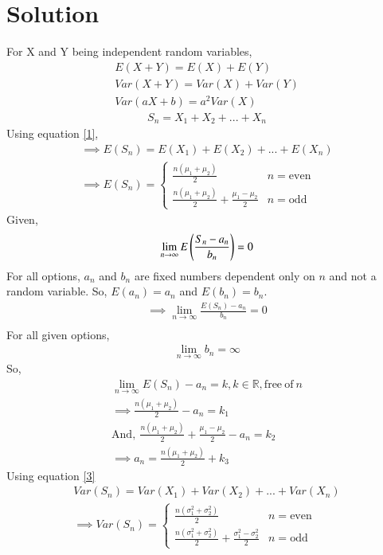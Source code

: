 \documentclass[journal,12pt,twocolumn]{IEEEtran}
\begin{document}
\section{Solution}
For X and Y being independent random variables,
\begin{align}
    E(X+Y)=E(X)+E(Y)\label{1}\\
    Var(X+Y)=Var(X)+Var(Y)\label{3}\\
    Var(aX+b)=a^2Var(X)\label{2}
    \end{align}
\begin{align}
    S_n=X_1+X_2+...+X_n
\end{align}
Using equation \eqref{1},
\begin{align}
    \implies E(S_n)=E(X_1)+E(X_2)+...+E(X_n)\\
    \implies E(S_n)=
    \begin{cases}
    \frac{n(\mu_1+\mu_2)}{2} & n=\mathrm{even}\\
    \frac{n(\mu_1+\mu_2)}{2}+\frac{\mu_1-\mu_2}{2} & n=\mathrm{odd}
    \end{cases}
\end{align}
Given,
\begin{align}
    \lim_{n \to\infty}E\left(\frac{S_n-a_n}{b_n}\right)=0
\end{align}
For all options, $a_n$ and $b_n$ are fixed numbers dependent only on $n$ and not a random variable. So, $E(a_n)=a_n$ and $E(b_n)=b_n$.
\begin{align}
    \implies \lim_{n \to\infty}\frac{E(S_n)-a_n}{b_n}=0\\
\end{align}
For all given options, 
\begin{align}
\lim_{n \to\infty}b_n=\infty 
\end{align}
So,
\begin{align}
\lim_{n \to\infty}E(S_n)-a_n=k, k\in\mathbb{R}, \mathrm{free\:of\:}n\\
\implies \frac{n(\mu_1+\mu_2)}{2}-a_n=k_1\\
\mathrm{And,\:}\frac{n(\mu_1+\mu_2)}{2}+\frac{\mu_1-\mu_2}{2}-a_n=k_2\\
\implies a_n=\frac{n(\mu_1+\mu_2)}{2}+k_3\label{5}
\end{align}
Using equation \eqref{3}
\begin{align}
    Var(S_n)=Var(X_1)+Var(X_2)+...+Var(X_n)\\
    \implies Var(S_n)=
    \begin{cases}
    \frac{n(\sigma_1^2+\sigma_2^2)}{2} & n=\mathrm{even}\\
    \frac{n(\sigma_1^2+\sigma_2^2)}{2}+\frac{\sigma_1^2-\sigma_2^2}{2} & n=\mathrm{odd}
    \end{cases}
\end{align}
\end{document}
